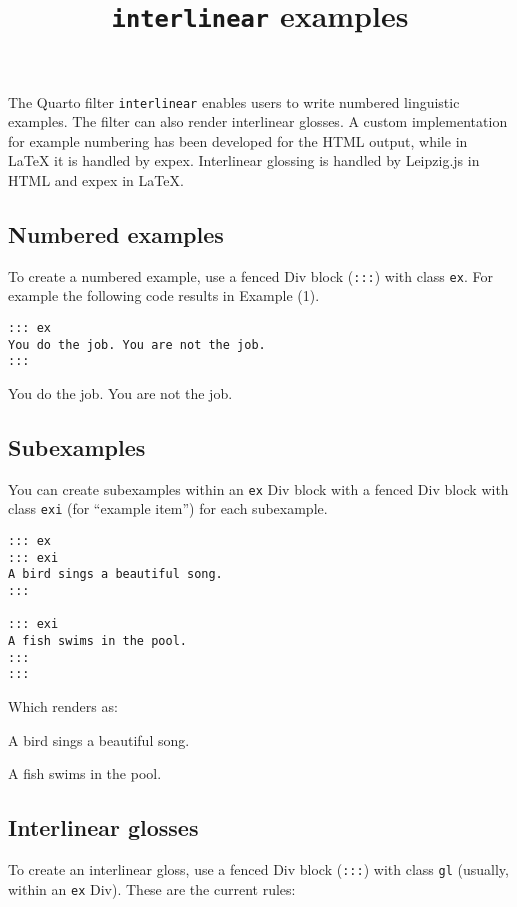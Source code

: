 \documentclass[
  letterpaper,
  DIV=11,
  numbers=noendperiod]{scrartcl}
\title{\texttt{interlinear} examples}
\author{}
\date{}
\begin{document}
\maketitle


The Quarto filter \texttt{interlinear} enables users to write numbered
linguistic examples. The filter can also render interlinear glosses. A
custom implementation for example numbering has been developed for the
HTML output, while in LaTeX it is handled by expex. Interlinear glossing
is handled by Leipzig.js in HTML and expex in LaTeX.

\subsection{Numbered examples}\label{numbered-examples}

To create a numbered example, use a fenced Div block (\texttt{:::}) with
class \texttt{ex}. For example the following code results in Example
(1).

\begin{verbatim}
::: ex
You do the job. You are not the job.
:::
\end{verbatim}

\pex
You do the job. You are not the job.
\xe

\subsection{Subexamples}\label{subexamples}

You can create subexamples within an \texttt{ex} Div block with a fenced
Div block with class \texttt{exi} (for ``example item'') for each
subexample.

\begin{verbatim}
::: ex
::: exi
A bird sings a beautiful song.
:::

::: exi
A fish swims in the pool.
:::
:::
\end{verbatim}

Which renders as:

\pex
\a A bird sings a beautiful song.

\a A fish swims in the pool.
\xe

\subsection{Interlinear glosses}\label{interlinear-glosses}

To create an interlinear gloss, use a fenced Div block (\texttt{:::})
with class \texttt{gl} (usually, within an \texttt{ex} Div). These are
the current rules:
\end{document}
